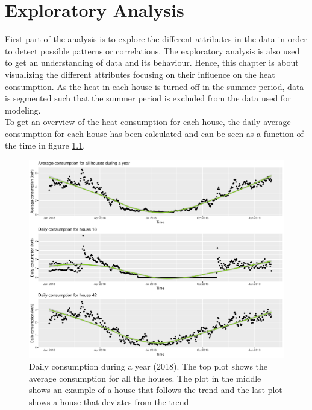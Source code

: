 \chapter{Exploratory Analysis}
First part of the analysis is to explore the different attributes in the data in order to detect possible patterns or correlations. The exploratory analysis is also used to get an understanding of data and its behaviour. Hence, this chapter is about visualizing the different attributes focusing on their influence on the heat consumption. As the heat in each house is turned off in the summer period, data is segmented such that the summer period is excluded from the data used for modeling. \\

\noindent To get an overview of the heat consumption for each house, the daily average consumption for each house has been calculated and can be seen as a function of the time in figure \ref{fig: daily_cons}. 

\begin{figure}
    \centering
    \includegraphics[width=.8\textwidth]{../../../figures/avg_daily.pdf}
    \caption{Daily consumption during a year (2018). The top plot shows the average consumption for all the houses. The plot in the middle shows an example of a house that follows the trend and the last plot shows a house that deviates from the trend}
    \label{fig: daily_cons}
\end{figure}


